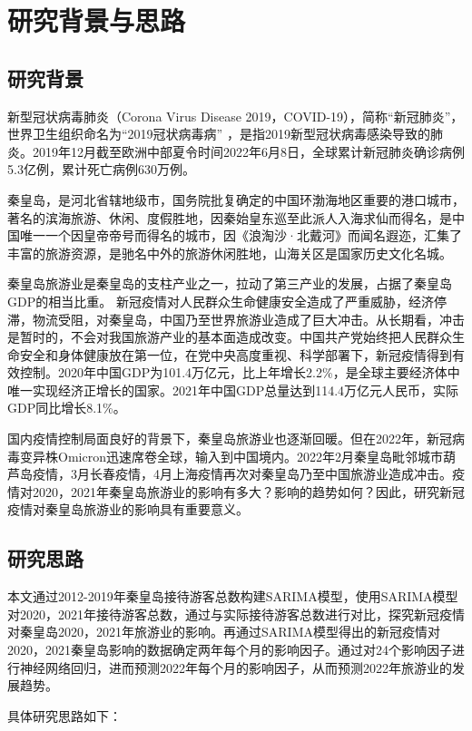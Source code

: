 \section{研究背景与思路}
\subsection{研究背景}
新型冠状病毒肺炎（Corona Virus Disease 2019，COVID-19），简称“新冠肺炎”，世界卫生组织命名为“2019冠状病毒病”   ，是指2019新型冠状病毒感染导致的肺炎。2019年12月截至欧洲中部夏令时间2022年6月8日，全球累计新冠肺炎确诊病例5.3亿例，累计死亡病例630万例。

秦皇岛，是河北省辖地级市，国务院批复确定的中国环渤海地区重要的港口城市，著名的滨海旅游、休闲、度假胜地，因秦始皇东巡至此派人入海求仙而得名，是中国唯一一个因皇帝帝号而得名的城市，因《浪淘沙·北戴河》而闻名遐迩，汇集了丰富的旅游资源，是驰名中外的旅游休闲胜地，山海关区是国家历史文化名城。

秦皇岛旅游业是秦皇岛的支柱产业之一，拉动了第三产业的发展，占据了秦皇岛GDP的相当比重。
新冠疫情对人民群众生命健康安全造成了严重威胁，经济停滞，物流受阻，对秦皇岛，中国乃至世界旅游业造成了巨大冲击。从长期看，冲击是暂时的，不会对我国旅游产业的基本面造成改变。中国共产党始终把人民群众生命安全和身体健康放在第一位，在党中央高度重视、科学部署下，新冠疫情得到有效控制。2020年中国GDP为101.4万亿元，比上年增长2.2\%，是全球主要经济体中唯一实现经济正增长的国家。2021年中国GDP总量达到114.4万亿元人民币，实际GDP同比增长8.1\%。

国内疫情控制局面良好的背景下，秦皇岛旅游业也逐渐回暖。但在2022年，新冠病毒变异株Omicron迅速席卷全球，输入到中国境内。2022年2月秦皇岛毗邻城市葫芦岛疫情，3月长春疫情，4月上海疫情再次对秦皇岛乃至中国旅游业造成冲击。疫情对2020，2021年秦皇岛旅游业的影响有多大？影响的趋势如何？因此，研究新冠疫情对秦皇岛旅游业的影响具有重要意义。



\subsection{研究思路}
本文通过2012-2019年秦皇岛接待游客总数构建SARIMA模型，使用SARIMA模型对2020，2021年接待游客总数，通过与实际接待游客总数进行对比，探究新冠疫情对秦皇岛2020，2021年旅游业的影响。再通过SARIMA模型得出的新冠疫情对2020，2021秦皇岛影响的数据确定两年每个月的影响因子。通过对24个影响因子进行神经网络回归，进而预测2022年每个月的影响因子，从而预测2022年旅游业的发展趋势。

具体研究思路如下：


